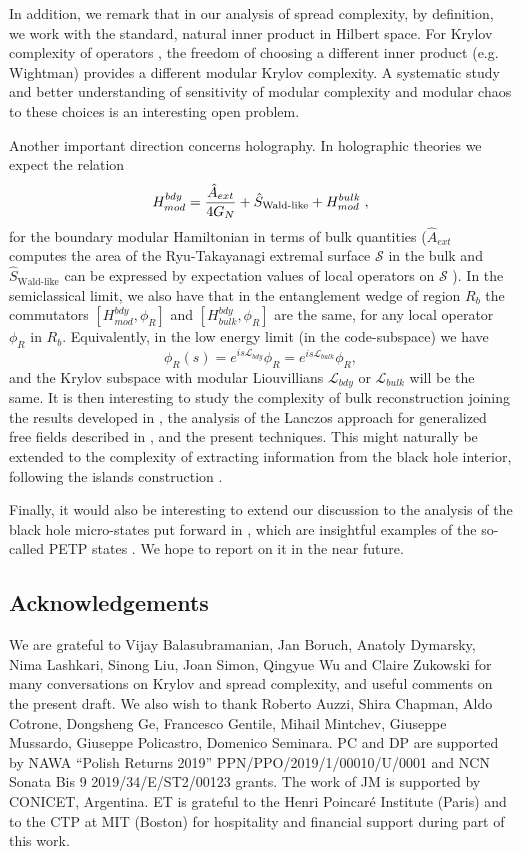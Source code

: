 \documentclass[aps,prl,twocolumn,showpacs,preprintnumbers,amsmath,amssymb]{revtex4-1}
\def\frac#1#2{{#1\over #2}}
\def\be{\begin{equation}}
\def\ee{\end{equation}}
\begin{document}
In addition, we remark that in our analysis of spread complexity, by definition, we work with the standard, natural inner product in Hilbert space. For Krylov complexity of operators \cite{Parker:2018yvk}, the freedom of choosing a different inner product (e.g. Wightman) provides a different modular Krylov complexity. A systematic study and better understanding of sensitivity of modular complexity and modular chaos to these choices is an interesting open problem.

Another important direction concerns holography. In holographic theories we expect the relation \cite{Jafferis:2015del}
\be
H^{bdy}_{mod}=\frac{\hat{A}_{ext}}{4G_N}+\hat{S}_{\text{Wald-like}}+H^{bulk}_{mod}\;,
\ee
for the boundary modular Hamiltonian in terms of bulk quantities ($\hat{A}_{ext}$ computes the area of the Ryu-Takayanagi \cite{Ryu:2006bv} extremal surface $\mathcal{S}$ in the bulk and $\hat{S}_{\text{Wald-like}}$ can be expressed by expectation values of local operators on $\mathcal{S}$ \cite{Jafferis:2015del}). In the semiclassical limit, we also have that in the entanglement wedge of region $R_b$ the commutators $[H^{bdy}_{mod},\phi_R]$ and $[H^{bdy}_{bulk},\phi_R]$ are the same, for any local operator $\phi_R$ in $R_b$. Equivalently, in the low energy limit (in the code-subspace) we have
\be
\phi_R(s)=e^{is\mathcal{L}_{bdy}}\phi_R=e^{is\mathcal{L}_{bulk}}\phi_R,
\ee
and the Krylov subspace with modular Liouvillians $\mathcal{L}_{bdy}$ or $\mathcal{L}_{bulk}$ will be the same. It is then interesting to study the complexity of bulk reconstruction joining the results developed in \cite{Faulkner:2017vdd}, the analysis of the Lanczos approach for generalized free fields described in \cite{Magan:2020iac}, and the present techniques. This might naturally be extended to the complexity of extracting information from the black hole interior, following the islands construction \cite{Penington:2019kki}.

Finally, it would also be interesting to extend our discussion to the analysis of the black hole micro-states put forward in \cite{Balasubramanian:2022gmo,Balasubramanian:2022lnw}, which are insightful examples of the so-called PETP states \cite{Goel:2018ubv}. We hope to report on it in the near future.

\subsection*{Acknowledgements} 
We are grateful to Vijay Balasubramanian, Jan Boruch, Anatoly Dymarsky,  Nima Lashkari, Sinong Liu, Joan Simon, Qingyue Wu and Claire Zukowski for many conversations on Krylov and spread complexity, and useful comments on the present draft. We also wish to thank Roberto Auzzi, Shira Chapman, Aldo Cotrone, Dongsheng Ge, Francesco Gentile, Mihail Mintchev, Giuseppe Mussardo, Giuseppe Policastro, Domenico Seminara. PC and DP are supported by NAWA “Polish Returns 2019” PPN/PPO/2019/1/00010/U/0001 and NCN Sonata Bis 9 2019/34/E/ST2/00123 grants. The work of JM is supported by CONICET, Argentina. ET is grateful to the Henri Poincar\'e Institute (Paris) and to the CTP at MIT (Boston) for hospitality and financial support during part of this work.
\end{document}
